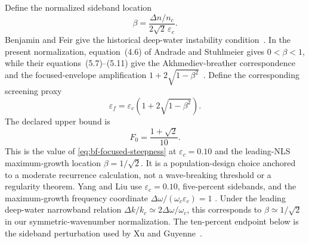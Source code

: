 \documentclass[11pt]{article}
\newcommand{\eps}{\varepsilon}
\begin{document}
Define the normalized sideband location
\begin{equation}
  \beta
  =\frac{\Delta n/n_c}{2\sqrt{2}\,\eps_c}.
  \label{eq:bf-instability-band}
\end{equation}
Benjamin and Feir give the historical deep-water instability
condition~\cite{benjaminfeir1967}.  In the present normalization,
equation~(4.6) of Andrade and Stuhlmeier gives $0<\beta<1$, while their
equations~(5.7)--(5.11) give the Akhmediev-breather correspondence and the
focused-envelope amplification
$1+2\sqrt{1-\beta^2}$~\cite{andrade2023}.  Define the corresponding screening
proxy
\begin{equation}
  \eps_f
  =\eps_c\left(1+2\sqrt{1-\beta^2}\right).
  \label{eq:bf-focused-steepness}
\end{equation}
The declared upper bound is
\begin{equation}
  F_0=\frac{1+\sqrt2}{10}.
  \label{eq:bf-focused-bound}
\end{equation}
This is the value of \eqref{eq:bf-focused-steepness} at
$\eps_c=0.10$ and the leading-NLS maximum-growth location
$\beta=1/\sqrt2$.  It is a population-design choice anchored to a moderate
recurrence calculation, not a wave-breaking threshold or a regularity
theorem.  Yang and Liu use $\eps_c=0.10$, five-percent sidebands, and the
maximum-growth frequency
coordinate $\Delta\omega/(\omega_c\eps_c)=1$
\cite[Sec.~4.3.1]{yangliu2024}.  Under the leading deep-water narrowband
relation $\Delta k/k_c\simeq2\Delta\omega/\omega_c$, this corresponds to
$\beta\simeq1/\sqrt2$ in our symmetric-wavenumber normalization.  The
ten-percent endpoint below is the sideband perturbation used by Xu and
Guyenne~\cite{xu2009}.
\end{document}
